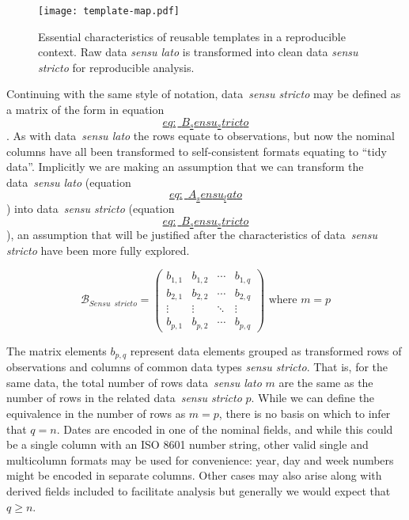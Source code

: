 \documentclass[
]{article}
\begin{document}
\begin{figure}
\hypertarget{fig_essential_template}{%
\centering
\texttt{[image: template-map.pdf]}
\caption{Essential characteristics of reusable templates in a
reproducible context. Raw data \emph{sensu lato} is transformed into
clean data \emph{sensu stricto} for reproducible
analysis.}\label{fig_essential_template}
}
\end{figure}

Continuing with the same style of notation, data~\emph{sensu stricto}
may be defined as a matrix of the form in equation
\protect\hyperlink{eq:_B_sensu_stricto}{\[eq:\_B_sensu_stricto\]}. As
with data~\emph{sensu lato} the rows equate to observations, but now the
nominal columns have all been transformed to self-consistent formats
equating to ``tidy data''. Implicitly we are making an assumption that
we can transform the data~\emph{sensu lato} (equation
\protect\hyperlink{eq:_A_sensu_lato}{\[eq:\_A_sensu_lato\]} ) into
data~\emph{sensu stricto} (equation
\protect\hyperlink{eq:_B_sensu_stricto}{\[eq:\_B_sensu_stricto\]}), an
assumption that will be justified after the characteristics of
data~\emph{sensu stricto} have been more fully explored.

\[\label{eq:_B_sensu_stricto}
    \mathscr{B}_{Sensu \enspace stricto} =
    \begin{pmatrix}
        b_{1,1} & b_{1,2} & \cdots & b_{1,q} \\
        b_{2,1} & b_{2,2} & \cdots & b_{2,q} \\
        \vdots  & \vdots  & \ddots & \vdots  \\
        b_{p,1} & b_{p,2} & \cdots & b_{p,q} 
    \end{pmatrix} 
    \textrm{ where } m = p\]

The matrix elements \(b_{p,q}\) represent data elements grouped as
transformed rows of observations and columns of common data types
\emph{sensu stricto}. That is, for the same data, the total number of
rows data~\emph{sensu lato} \(m\) are the same as the number of rows in
the related data~\emph{sensu stricto} \(p\). While we can define the
equivalence in the number of rows as \(m = p\), there is no basis on
which to infer that \(q = n\). Dates are encoded in one of the nominal
fields, and while this could be a single column with an ISO 8601 number
string, other valid single and multicolumn formats may be used for
convenience: year, day and week numbers might be encoded in separate
columns. Other cases may also arise along with derived fields included
to facilitate analysis but generally we would expect that \(q \geq n\).
\end{document}
